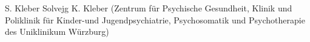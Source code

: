 
                {S.  Kleber}
                {Solvejg K. Kleber (Zentrum für Psychische Gesundheit, Klinik und Poliklinik für Kinder-und Jugendpsychiatrie, Psychosomatik  und Psychotherapie des Uniklinikum Würzburg)}
                